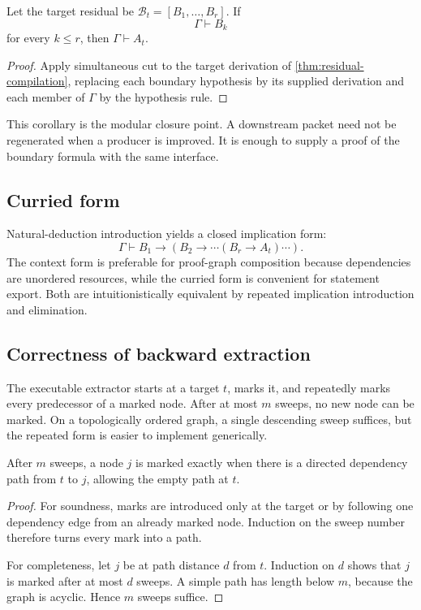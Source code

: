 \begin{corollary}\label{cor:boundary-discharge}
Let the target residual be \(\mathcal B_t=[B_1,\ldots,B_r]\).  If
\[
 \Gamma\vdash B_k
\]
for every \(k\le r\), then \(\Gamma\vdash A_t\).
\end{corollary}

\begin{proof}
Apply simultaneous cut to the target derivation of \cref{thm:residual-compilation}, replacing each boundary hypothesis by its supplied derivation and each member of \(\Gamma\) by the hypothesis rule.
\end{proof}

This corollary is the modular closure point.  A downstream packet need not be regenerated when a producer is improved.  It is enough to supply a proof of the boundary formula with the same interface.

\subsection{Curried form}

Natural-deduction introduction yields a closed implication form:
\[
 \Gamma\vdash B_1\to(B_2\to\cdots(B_r\to A_t)\cdots).
\]
The context form is preferable for proof-graph composition because dependencies are unordered resources, while the curried form is convenient for statement export.  Both are intuitionistically equivalent by repeated implication introduction and elimination.

\subsection{Correctness of backward extraction}

The executable extractor starts at a target \(t\), marks it, and repeatedly marks every predecessor of a marked node.  After at most \(m\) sweeps, no new node can be marked.  On a topologically ordered graph, a single descending sweep suffices, but the repeated form is easier to implement generically.

\begin{lemma}\label{lem:reachability}
After \(m\) sweeps, a node \(j\) is marked exactly when there is a directed dependency path from \(t\) to \(j\), allowing the empty path at \(t\).
\end{lemma}

\begin{proof}
For soundness, marks are introduced only at the target or by following one dependency edge from an already marked node.  Induction on the sweep number therefore turns every mark into a path.

For completeness, let \(j\) be at path distance \(d\) from \(t\).  Induction on \(d\) shows that \(j\) is marked after at most \(d\) sweeps.  A simple path has length below \(m\), because the graph is acyclic.  Hence \(m\) sweeps suffice.
\end{proof}

